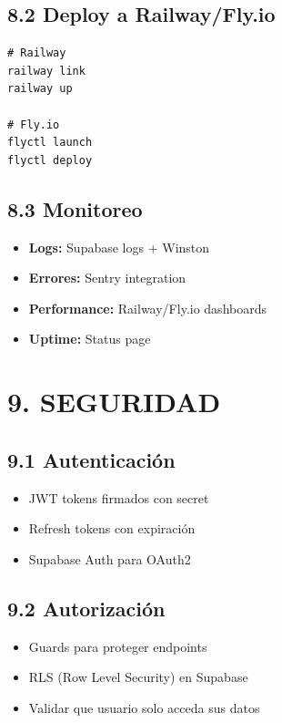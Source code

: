 \documentclass[12pt,a4paper]{article}
\begin{document}
\subsection{8.2 Deploy a Railway/Fly.io}

\begin{verbatim}
# Railway
railway link
railway up

# Fly.io
flyctl launch
flyctl deploy
\end{verbatim}

\subsection{8.3 Monitoreo}

\begin{itemize}
    \item \textbf{Logs:} Supabase logs + Winston
    \item \textbf{Errores:} Sentry integration
    \item \textbf{Performance:} Railway/Fly.io dashboards
    \item \textbf{Uptime:} Status page
\end{itemize}

\section{9. SEGURIDAD}

\subsection{9.1 Autenticación}

\begin{itemize}
    \item JWT tokens firmados con secret
    \item Refresh tokens con expiración
    \item Supabase Auth para OAuth2
\end{itemize}

\subsection{9.2 Autorización}

\begin{itemize}
    \item Guards para proteger endpoints
    \item RLS (Row Level Security) en Supabase
    \item Validar que usuario solo acceda sus datos
\end{itemize}
\end{document}
